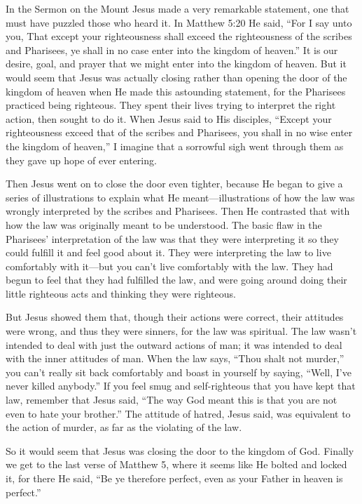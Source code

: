 In the Sermon on the Mount Jesus made a very remarkable
statement, one that must have puzzled those who
heard it. In Matthew 5:20 He said, “For I say unto you, That
except your righteousness shall exceed the righteousness of
the scribes and Pharisees, ye shall in no case enter into the
kingdom of heaven.” It is our desire, goal, and prayer that
we might enter into the kingdom of heaven. But it would
seem that Jesus was actually closing rather than opening
the door of the kingdom of heaven when He made this
astounding statement, for the Pharisees practiced being
righteous. They spent their lives trying to interpret the right
action, then sought to do it. When Jesus said to His disciples,
“Except your righteousness exceed that of the scribes
and Pharisees, you shall in no wise enter the kingdom of
heaven,” I imagine that a sorrowful sigh went through them
as they gave up hope of ever entering.

Then Jesus went on to close the door even tighter,
because He began to give a series of illustrations to explain
what He meant—illustrations of how the law was wrongly
interpreted by the scribes and Pharisees. Then He contrasted
that with how the law was originally meant to be
understood. The basic flaw in the Pharisees’ interpretation
of the law was that they were interpreting it so they could
fulfill it and feel good about it. They were interpreting the
law to live comfortably with it—but you can’t live comfortably
with the law. They had begun to feel that they had fulfilled
the law, and were going around doing their little righteous
acts and thinking they were righteous.

But Jesus showed them that, though their actions were
correct, their attitudes were wrong, and thus they were sinners,
for the law was spiritual. The law wasn’t intended to
deal with just the outward actions of man; it was intended
to deal with the inner attitudes of man. When the law says,
“Thou shalt not murder,” you can’t really sit back comfortably
and boast in yourself by saying, “Well, I’ve never killed
anybody.” If you feel smug and self-righteous that you have
kept that law, remember that Jesus said, “The way God
meant this is that you are not even to hate your brother.”
The attitude of hatred, Jesus said, was equivalent to the
action of murder, as far as the violating of the law.

So it would seem that Jesus was closing the door to the
kingdom of God. Finally we get to the last verse of Matthew
5, where it seems like He bolted and locked it, for there He
said, “Be ye therefore perfect, even as your Father in heaven
is perfect.”


